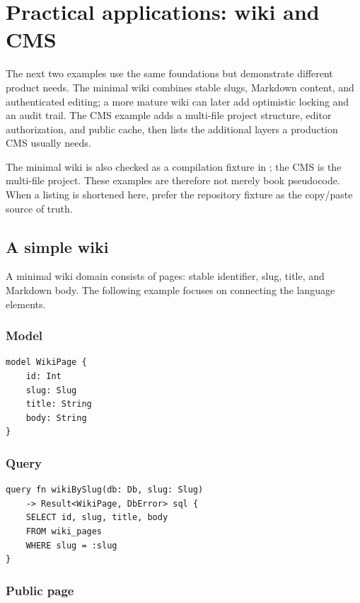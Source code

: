\chapter{Practical applications: wiki and CMS}

The next two examples use the same foundations but demonstrate different product needs. The minimal wiki combines stable slugs, Markdown content, and authenticated editing; a more mature wiki can later add optimistic locking and an audit trail. The CMS example adds a multi-file project structure, editor authorization, and public cache, then lists the additional layers a production CMS usually needs.

The minimal wiki is also checked as a compilation fixture in ; the CMS is the multi-file  project. These examples are therefore not merely book pseudocode. When a listing is shortened here, prefer the repository fixture as the copy/paste source of truth.

\section{A simple wiki}

A minimal wiki domain consists of pages: stable identifier, slug, title, and Markdown body. The following example focuses on connecting the language elements.

\subsection*{Model}

\begin{lstlisting}[language=RWLang]
model WikiPage {
    id: Int
    slug: Slug
    title: String
    body: String
}
\end{lstlisting}

\subsection*{Query}

\begin{lstlisting}[language=RWLang]
query fn wikiBySlug(db: Db, slug: Slug)
    -> Result<WikiPage, DbError> sql {
    SELECT id, slug, title, body
    FROM wiki_pages
    WHERE slug = :slug
}
\end{lstlisting}

\subsection*{Public page}

